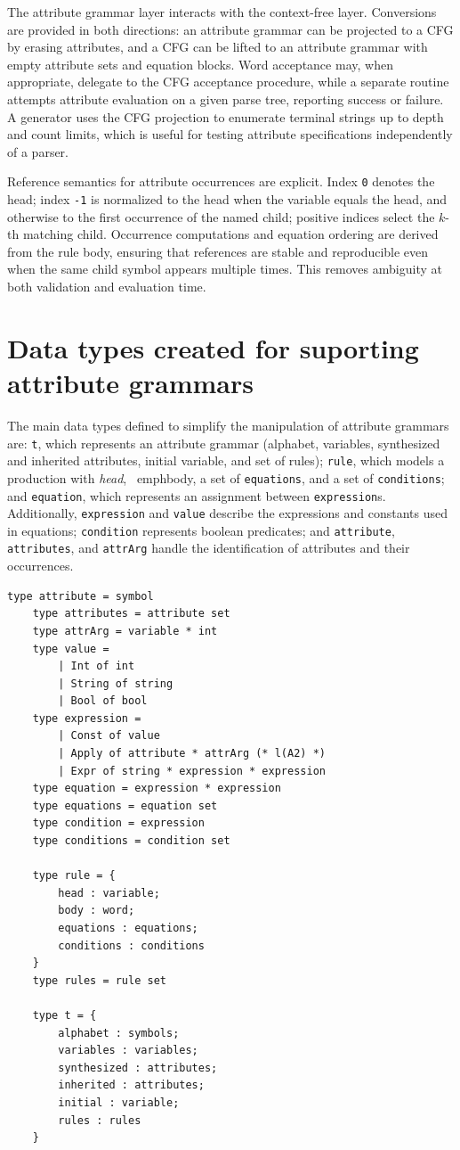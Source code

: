 The attribute grammar layer interacts with the context-free layer. Conversions are provided in both directions: an attribute grammar can be projected to 
a CFG by erasing attributes, and a CFG can be lifted to an attribute grammar with empty attribute sets and equation blocks. Word acceptance may, when 
appropriate, delegate to the CFG acceptance procedure, while a separate routine attempts attribute evaluation on a given parse tree, reporting success 
or failure. A generator uses the CFG projection to enumerate terminal strings up to depth and count limits, which is useful for testing attribute 
specifications independently of a parser.

Reference semantics for attribute occurrences are explicit. Index \texttt{0} denotes the head; index \texttt{-1} is normalized to the head when the variable 
equals the head, and otherwise to the first occurrence of the named child; positive indices select the \(k\)-th matching child. Occurrence computations and 
equation ordering are derived from the rule body, ensuring that references are stable and reproducible even when the same child symbol appears multiple 
times. This removes ambiguity at both validation and evaluation time.

\section{Data types created for suporting attribute grammars} 

The main data types defined to simplify the manipulation of attribute grammars are: \texttt{t}, which represents an attribute grammar (alphabet, 
variables, synthesized and inherited attributes, initial variable, and set of rules); \texttt{rule}, which models a production with \emph{head}, \
emph{body}, a set of \texttt{equations}, and a set of \texttt{conditions}; and \texttt{equation}, which represents an assignment between 
\texttt{expression}s. Additionally, \texttt{expression} and \texttt{value} describe the expressions and constants used in equations; 
\texttt{condition} represents boolean predicates; and \texttt{attribute}, \texttt{attributes}, and \texttt{attrArg} handle the identification of 
attributes and their occurrences.

\begin{verbatim}
type attribute = symbol
    type attributes = attribute set
    type attrArg = variable * int
    type value =
        | Int of int
        | String of string
        | Bool of bool
    type expression =
        | Const of value
        | Apply of attribute * attrArg (* l(A2) *)
        | Expr of string * expression * expression
    type equation = expression * expression
    type equations = equation set
    type condition = expression 
    type conditions = condition set

    type rule = {
        head : variable;
        body : word;
        equations : equations;
        conditions : conditions
    }
    type rules = rule set

    type t = {
        alphabet : symbols;
        variables : variables;
        synthesized : attributes;
        inherited : attributes;
        initial : variable;
        rules : rules
    }
\end{verbatim}


